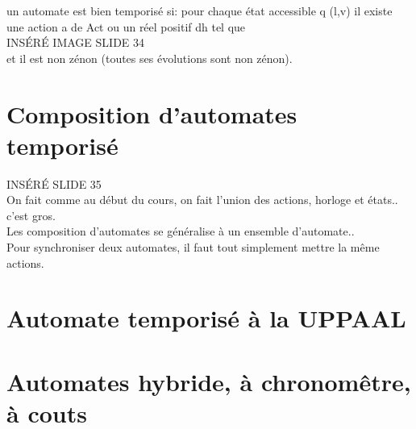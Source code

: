\documentclass[oneside]{book}
\begin{document}
    un automate est bien temporisé si: pour chaque état accessible q (l,v) il existe une action a de Act ou un réel positif dh tel que \\
    
    INSÉRÉ IMAGE SLIDE 34\\
    
    et il est non zénon (toutes ses évolutions sont non zénon).
    \section{Composition d'automates temporisé}
    
    INSÉRÉ SLIDE 35\\
    
    On fait comme au début du cours, on fait l'union des actions, horloge et états.. c'est gros.\\
    
    Les composition d'automates se généralise à un ensemble  d'automate..\\
    
    Pour synchroniser deux automates, il faut tout simplement mettre la même actions.\\
    
    
    \section{Automate temporisé à la UPPAAL}
    \section{Automates hybride, à chronomêtre, à couts}
    
\end{document}
